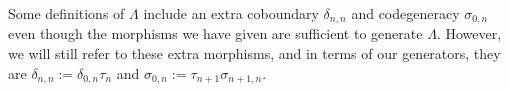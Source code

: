 
Some definitions of $\Lambda$ include an extra 
coboundary $\delta_{n,n}$ and codegeneracy 
$\sigma_{0,n}$ even though the morphisms we have given 
are sufficient to generate $\Lambda$. However, 
we will still refer to these extra 
morphisms, and in terms of our generators, they are 
$\delta_{n,n} := \delta_{0,n}\tau_n$ and 
$\sigma_{0,n} := \tau_{n+1} \sigma_{n+1,n}$.